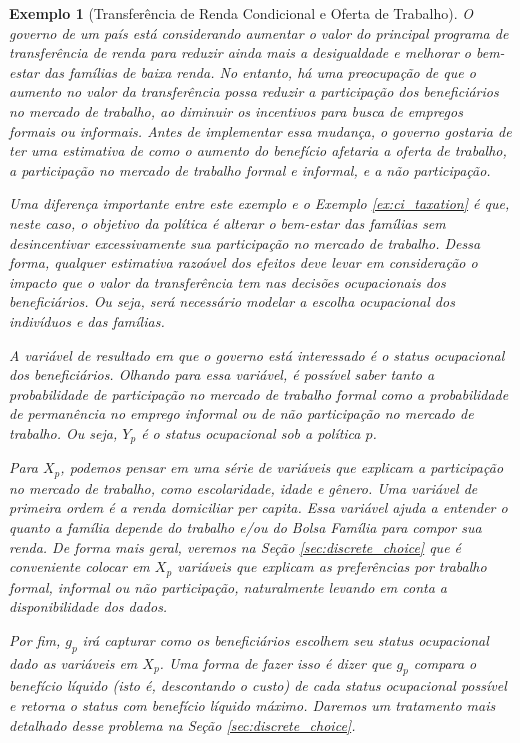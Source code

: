 \documentclass[12pt]{article}
\theoremstyle{break}
\newtheorem{exemplo}{Exemplo}
\begin{document}
\vspace{0.25cm}

\begin{exemplo}[Transferência de Renda Condicional e Oferta de Trabalho]
\label{ex:cct_work}
O governo de um país está considerando aumentar o valor do principal programa de transferência de renda para reduzir ainda mais a desigualdade e melhorar o bem-estar das famílias de baixa renda. No entanto, há uma preocupação de que o aumento no valor da transferência possa reduzir a participação dos beneficiários no mercado de trabalho, ao diminuir os incentivos para busca de empregos formais ou informais. Antes de implementar essa mudança, o governo gostaria de ter uma estimativa de como o aumento do benefício afetaria a oferta de trabalho, a participação no mercado de trabalho formal e informal, e a não participação.

Uma diferença importante entre este exemplo e o Exemplo \ref{ex:ci_taxation} é que, neste caso, o objetivo da política é alterar o bem-estar das famílias sem desincentivar excessivamente sua participação no mercado de trabalho. Dessa forma, qualquer estimativa razoável dos efeitos deve levar em consideração o impacto que o valor da transferência tem nas decisões ocupacionais dos beneficiários. Ou seja, será necessário modelar a escolha ocupacional dos indivíduos e das famílias.

A variável de resultado em que o governo está interessado é o status ocupacional dos beneficiários. Olhando para essa variável, é possível saber tanto a probabilidade de participação no mercado de trabalho formal como a probabilidade de permanência no emprego informal ou de não participação no mercado de trabalho. Ou seja, $Y_p$ é o status ocupacional sob a política $p$.

Para $X_p$, podemos pensar em uma série de variáveis que explicam a participação no mercado de trabalho, como escolaridade, idade e gênero. Uma variável de primeira ordem é a renda domiciliar per capita. Essa variável ajuda a entender o quanto a família depende do trabalho e/ou do Bolsa Família para compor sua renda. De forma mais geral, veremos na Seção \ref{sec:discrete_choice} que é conveniente colocar em $X_p$ variáveis que explicam as preferências por trabalho formal, informal ou não participação, naturalmente levando em conta a disponibilidade dos dados.

Por fim, $g_p$ irá capturar como os beneficiários escolhem seu status ocupacional dado as variáveis em $X_p$. Uma forma de fazer isso é dizer que $g_p$ compara o benefício líquido (isto é, descontando o custo) de cada status ocupacional possível e retorna o status com benefício líquido máximo. Daremos um tratamento mais detalhado desse problema na Seção \ref{sec:discrete_choice}.

\end{exemplo}
\end{document}
